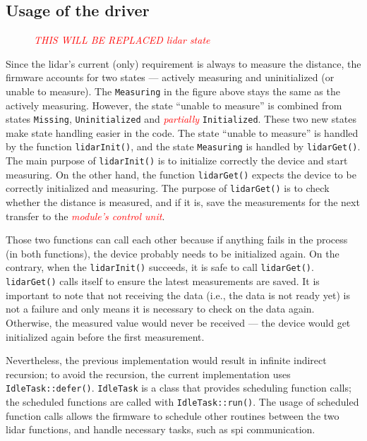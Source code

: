 \documentclass[
  digital,     %
  oneside,     %
  nosansbold,  %
  nocolorbold, %
  nolof,         %
  nolot,         %
]{fithesis4}
\newcommand{\TODO}[1]{\textcolor{red}{\textit{#1}}}
\begin{document}
{{{\subsection{ Usage of the driver }

\begin{figure}[ht]
    
    \caption[Diagram of \acrshort{lidar}'s state]{\TODO{THIS WILL BE REPLACED lidar state}}
    \label{fig:lidar-state}
\end{figure}

Since the \acrshort{lidar}'s current (only) requirement is always to measure the distance, the firmware accounts for two states --- actively measuring and uninitialized (or unable to measure). The \verb|Measuring| in the figure above stays the same as the actively measuring. However, the state ``unable to measure'' is combined from states \verb|Missing|, \verb|Uninitialized| and \TODO{partially} \verb|Initialized|. These two new states make state handling easier in the code. The state ``unable to measure'' is handled by the function \lstinline|lidarInit()|, and the state \verb|Measuring| is handled by \lstinline|lidarGet()|. The main purpose of \lstinline|lidarInit()| is to initialize correctly the device and start measuring. On the other hand, the function \lstinline|lidarGet()| expects the device to be correctly initialized and measuring. The purpose of \lstinline|lidarGet()| is to check whether the distance is measured, and if it is, save the measurements for the next transfer to the \TODO{module's control unit}.

Those two functions can call each other because if anything fails in the process (in both functions), the device probably needs to be initialized again. On the contrary, when the \lstinline|lidarInit()| succeeds, it is safe to call \lstinline|lidarGet()|. \lstinline|lidarGet()| calls itself to ensure the latest measurements are saved. It is important to note that not receiving the data (i.e., the data is not ready yet) is not a failure and only means it is necessary to check on the data again. Otherwise, the measured value would never be received --- the device would get initialized again before the first measurement.

Nevertheless, the previous implementation would result in infinite indirect recursion; to avoid the recursion, the current implementation uses \lstinline|IdleTask::defer()|. \lstinline|IdleTask| is a class that provides scheduling function calls; the scheduled functions are called with \lstinline[breaklines=false]|IdleTask::run()|. The usage of scheduled function calls allows the firmware to schedule other routines between the two lidar functions, and handle necessary tasks, such as \acrshort{spi} communication.

}}}
\end{document}
